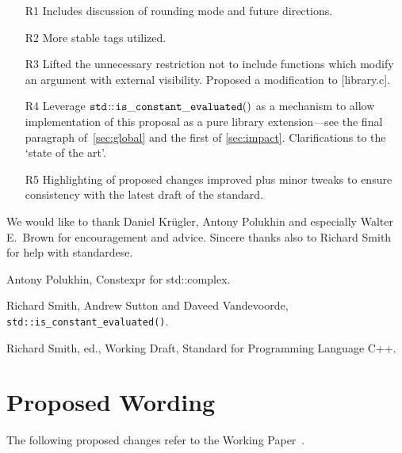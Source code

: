 \documentclass[prd,twocolumn,amsmath,amssymb,nofootinbib,eqsecnum]{revtex4-1}
\newcommand{\code}[1]{{\tt #1}}
\begin{document}
\begin{enumerate}
	\item[R1] Includes discussion of rounding mode and future directions. 
	
	\item[R2] More stable tags utilized.
	
	\item[R3] Lifted the unnecessary restriction not to include functions which modify an argument with external visibility. Proposed a modification to [library.c].
	
	\item [R4] Leverage $\code{std\!::\!is\_constant\_evaluated()}$ as a mechanism to allow implementation of this proposal as a pure library extension---see the final paragraph of~\ref{sec:global} and the first of \ref{sec:impact}. Clarifications to the `state of the art'.
	
	\item [R5] Highlighting of proposed changes improved plus minor tweaks to ensure consistency with the latest draft of the standard.
\end{enumerate}

\begin{acknowledgments}
	We would like to thank Daniel Kr\"ugler, Antony Polukhin and especially Walter E.~Brown 
	for encouragement and advice. Sincere thanks also to Richard Smith for help with standardese.
\end{acknowledgments}


\begin{thebibliography}{1}
	 Antony Polukhin, Constexpr for std::complex.	
	
	 Richard Smith, Andrew Sutton and Daveed Vandevoorde, \code{std\!::\!is\_constant\_evaluated()}.
	
	 Richard Smith, ed., Working Draft, Standard for Programming Language C++.	
\end{thebibliography}

\newpage

\onecolumngrid

\section{Proposed Wording}

\setlength{\parindent}{0pt}


The following proposed changes refer to the Working Paper~\cite{WorkingPaper}.
\end{document}
